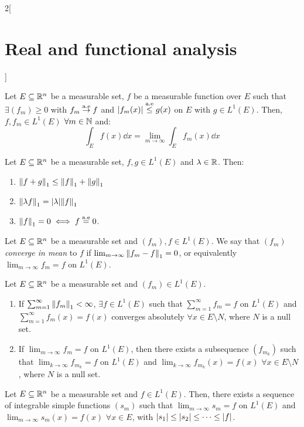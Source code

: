 \documentclass[../../../main_math.tex]{subfiles}
\begin{document}
\begin{multicols}{2}[\section{Real and functional analysis}]
\begin{theorem}
    Let $E\subseteq\mathbb{R}^n$ be a measurable set, $f$ be a measurable function over $E$ such that $\exists (f_m)\geq 0$ with $f_m\overset{\text{a.e}}{\rightarrow} f$ and $\abs{f_m(x)}\overset{\text{a.e}}{\leq} g(x)$ on $E$ with $g\in L^1(E)$. Then, $f, f_m\in L^1(E)$ $\forall m\in\mathbb{N}$ and: $$\int_Ef(x)\dd{x}=\lim_{m\to\infty}\int_Ef_m(x)\dd{x}$$
  \end{theorem}
  \begin{proposition}
    Let $E\subseteq\mathbb{R}^n$ be a measurable set, $f,g\in L^1(E)$ and $\lambda\in\mathbb{R}$. Then:
    \begin{enumerate}
      \item ${\left\|f+g\right\|}_1\leq{\left\|f\right\|}_1+{\left\|g\right\|}_1$
      \item ${\left\|\lambda f\right\|}_1=\abs{\lambda}{\left\|f\right\|}_1$
      \item ${\left\|f\right\|}_1=0\iff f\overset{\text{a.e}}{=}0$.
    \end{enumerate}
  \end{proposition}
  \begin{definition}
    Let $E\subseteq\mathbb{R}^n$ be a measurable set and $(f_m),f\in L^1(E)$. We say that $(f_m)$ \emph{converge in mean} to $f$ if $\lim_{m\to\infty}{\left\|f_m-f\right\|}_1=0$, or equivalently $\lim_{m\to\infty} f_m=f$ on $ L^1(E)$.
  \end{definition}
  \begin{theorem}
    Let $E\subseteq\mathbb{R}^n$ be a measurable set and $(f_m)\in L^1(E)$.
    \begin{enumerate}
      \item If $\sum_{m=1}^\infty {\left\|f_m\right\|}_1<\infty$, $\exists f\in L^1(E)$ such that $\sum_{m=1}^\infty f_m =f$ on $ L^1(E)$ and $\sum_{m=1}^\infty f_m(x)=f(x)$ converges absolutely $\forall x\in E\setminus N$, where $N$ is a null set.
      \item If $\lim_{m\to\infty} f_m=f$ on $ L^1(E)$, then there exists a subsequence $(f_{m_k})$ such that $\lim_{k\to\infty} f_{m_k}=f$ on $ L^1(E)$ and  $\lim_{k\to\infty} f_{m_k}(x)=f(x)$ $\forall x\in E\setminus N$, where $N$ is a null set.
    \end{enumerate}
  \end{theorem}
  \begin{proposition}
    Let $E\subseteq\mathbb{R}^n$ be a measurable set and $f\in L^1(E)$. Then, there exists a sequence of integrable simple functions $(s_m)$ such that $\lim_{m\to\infty} s_m=f$ on $ L^1(E)$ and $\lim_{m\to\infty} s_m(x)=f(x)$ $\forall x\in E$, with $\abs{s_1}\leq\abs{s_2}\leq \cdots\leq \abs{f}$.
  \end{proposition}

\end{multicols}
\end{document}
